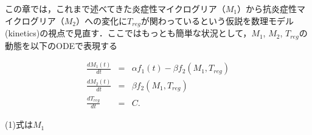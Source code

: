 \documentclass{jsarticle}
\begin{document}
この章では，これまで述べてきた炎症性マイクログリア（$M_1$）から抗炎症性マイクログリア（$M_2$）への変化に$T_{reg}$が関わっているという仮説を数理モデル(kinetics)の視点で見直す．ここではもっとも簡単な状況として，$M_1$, $M_2$, $T_{reg}$の動態を以下のODEで表現する

\begin{eqnarray}
  \frac{dM_{1}(t)}{dt} &=& \alpha f_1(t)- \beta f_2(M_1, T_{reg}) \\
  \frac{dM_2(t)}{dt} &=& \beta f_2(M_1, T_{reg}) \\
  \frac{dT_{reg}}{dt} &=& C .
\end{eqnarray}

(1)式は$M_1$
\end{document}
